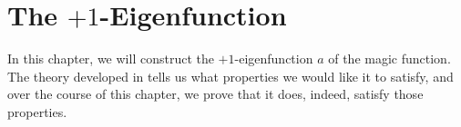 \chapter{The $+1$-Eigenfunction}

In this chapter, we will construct the $+1$-eigenfunction $a$ of the magic function. The theory developed in  tells us what properties we would like it to satisfy, and over the course of this chapter, we prove that it does, indeed, satisfy those properties.